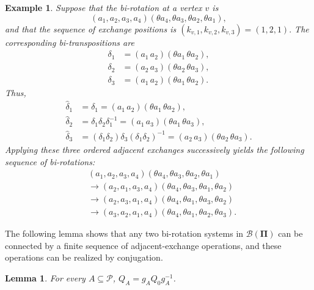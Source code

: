\documentclass[10pt,a4paper]{amsart}
\newtheorem{lemma}[theorem]{Lemma}
\newtheorem{example}[theorem]{Example}
\begin{document}
\begin{example}Suppose that the bi-rotation at a vertex $v$ is
$$(a_1,a_2,a_3,a_4) (\theta a_4,\theta a_3,\theta a_2,\theta a_1),$$
and that the sequence of exchange positions is
$(k_{v,1},k_{v,2},k_{v,3})=(1,2,1).$
The corresponding bi-transpositions are
$$\begin{aligned}
\delta_1&=(a_1\,a_2)(\theta a_1\,\theta a_2),\\
\delta_2&=(a_2\,a_3)(\theta a_2\,\theta a_3),\\
\delta_3&=(a_1\,a_2)(\theta a_1\,\theta a_2).
\end{aligned}$$
Thus, $$\begin{aligned}
\widehat\delta_1 &=\delta_1 =(a_1\,a_2)(\theta a_1\,\theta a_2),\\
\widehat\delta_2 &=\delta_1\delta_2\delta_1^{-1} =(a_1\,a_3)(\theta a_1\,\theta a_3),\\
\widehat\delta_3 &=(\delta_1\delta_2)\delta_3 (\delta_1\delta_2)^{-1} =(a_2\,a_3)(\theta a_2\,\theta a_3).
\end{aligned}$$
Applying these three ordered adjacent exchanges successively yields the following sequence of bi-rotations:
$$\begin{aligned}
&(a_1,a_2,a_3,a_4) (\theta a_4,\theta a_3,\theta a_2,\theta a_1)\\
&\longrightarrow (a_2,a_1,a_3,a_4) (\theta a_4,\theta a_3,\theta a_1,\theta a_2)\\
&\longrightarrow (a_2,a_3,a_1,a_4) (\theta a_4,\theta a_1,\theta a_3,\theta a_2)\\
&\longrightarrow (a_3,a_2,a_1,a_4) (\theta a_4,\theta a_1,\theta a_2,\theta a_3).
\end{aligned}$$
\end{example}


The following lemma shows that any two bi-rotation systems in $\mathcal B(\mathbf{\Pi})$ can be connected by a finite sequence of adjacent-exchange operations, and these operations can be realized by conjugation.

\begin{lemma} \label{lem2:7} For every $A\subseteq\mathcal P$, $Q_A=g_AQ_0g_A^{-1}$.\end{lemma}
\end{document}
